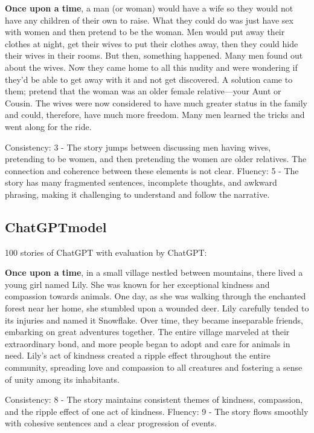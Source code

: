 \documentclass{article}
\begin{document}
\textbf{Once upon a time}, a man (or woman) would have a wife so they would not have any children of their own to raise. What they could do was just have sex with women and then pretend to be the woman. Men would put away their clothes at night, get their wives to put their clothes away, then they could hide their wives in their rooms. But then, something happened. Many men found out about the wives. Now they came home to all this nudity and were wondering if they'd be able to get away with it and not get discovered. A solution came to them; pretend that the woman was an older female relative—your Aunt or Cousin. The wives were now considered to have much greater status in the family and could, therefore, have much more freedom. Many men learned the tricks and went along for the ride.

Consistency: 3 - The story jumps between discussing men having wives, pretending to be women, and then pretending the women are older relatives. The connection and coherence between these elements is not clear.
Fluency: 5 - The story has many fragmented sentences, incomplete thoughts, and awkward phrasing, making it challenging to understand and follow the narrative.


\subsection{ChatGPTmodel}

100 stories of ChatGPT with evaluation by ChatGPT:

\textbf{Once upon a time}, in a small village nestled between mountains, there lived a young girl named Lily. She was known for her exceptional kindness and compassion towards animals. One day, as she was walking through the enchanted forest near her home, she stumbled upon a wounded deer. Lily carefully tended to its injuries and named it Snowflake. Over time, they became inseparable friends, embarking on great adventures together. The entire village marveled at their extraordinary bond, and more people began to adopt and care for animals in need. Lily's act of kindness created a ripple effect throughout the entire community, spreading love and compassion to all creatures and fostering a sense of unity among its inhabitants.

Consistency: 8 - The story maintains consistent themes of kindness, compassion, and the ripple effect of one act of kindness.
Fluency: 9 - The story flows smoothly with cohesive sentences and a clear progression of events.
\end{document}
